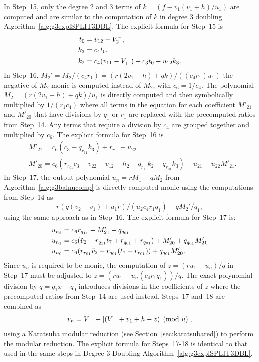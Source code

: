 In Step~15, only the degree 2 and 3 terms of $k = (f - v_1(v_1 + h)/u_1)$ are
computed and are similar to the computation of $k$ in degree 3 doubling
Algorithm~\ref{alg:g3explSPLIT3DBL}. The explicit formula for Step~15 is
\begin{align*}
    t_0 &= v_{12} - V^{-}_2,\\
    k_3 &= c_4t_0,\\
    k_2 &= c_4(v_{11} - V^{-}_1) + c_3t_0 - u_{12}k_3.
\end{align*}
In Step~16, $M_2' = M_2/(c_4r_1) = (r(2v_1 + h) + qk)/((c_4r_1)u_1)$ the
negative of $M_2$ monic is computed instead of $M_2$, with $c_6 = 1/c_4$. The
polynomial $M_2 = (r(2v_1 + h) + qk)/u_1$ is directly computed and then
symbolically multiplied by $1/(r_1c_4)$ where all terms in the equation for each
coefficient $M'_{21}$ and $M'_{20}$ that have divisions by $q_1$ or $r_1$ are
replaced with the precomputed ratios from Step~14. Any terms that require a
division by $c_4$ are grouped together and multiplied by $c_6$. The explicit
formula for Step~16 is  
\begin{align*} 
    & M'_{21} = c_6(c_3 - q_{r_{11}}k_3) + r_{r_{01}} - u_{22}    \\
    & M'_{20} = c_6(r_{r_{01}}c_3 - v_{22} - v_{12} - h_2 - q_{r_{11}}k_2 - q_{r_{01}}k_3) - u_{21} - u_{22}M'_{21}.
\end{align*}
In Step~17, the output polynomial $u_n = rM_1 - qM_2$ from
Algorithm~\ref{alg:g3balnucomp} is directly computed monic using the
computations from Step~14 as  $$r(q(v_2 - v_1) + u_1r)/(u_2c_4r_1q_1) -
qM_2'/q_1,$$ using the same approach as in Step~16. The explicit formula for
Step~17 is:
\begin{align*} 
    & u_{n_2} = c_6r_{q_{11}} + M'_{21} + q_{q_{01}}          \\
    & u_{n_1} = c_6(\tilde{v}_2 + r_{q_{11}}t_7 + r_{q_{01}} + r_{q_{01}}) + M'_{20} + q_{q_{01}}M'_{21}    \\
    & u_{n_0} = c_6(r_{r_{01}}\tilde{v}_2 + r_{q_{01}}(t_7 + r_{r_{01}})) + q_{q_{01}}M'_{20}.
\end{align*}
Since $u_n$ is required to be monic, the computation of $z = (ru_1 - u_n)/q$ in
Step~17 must be adjusted to $z = (ru_1 - u_n(c_4r_1q_1))/q$. The exact
polynomial division by $q = q_1x + q_0$ introduces divisions in the coefficients
of $z$ where the precomputed ratios from Step~14 are used instead. Steps~17
and~18 are combined as $$v_n = V^{-} - [(V^{-} + v_1 + h - z) \pmod{u}],$$ using a
Karatsuba modular reduction (see Section~\ref{sec:karatsubared}) to perform the
modular reduction. The explicit formula for Steps~17-18 is identical to that used in the same
steps in Degree 3 Doubling Algorithm~\ref{alg:g3explSPLIT3DBL}. 

